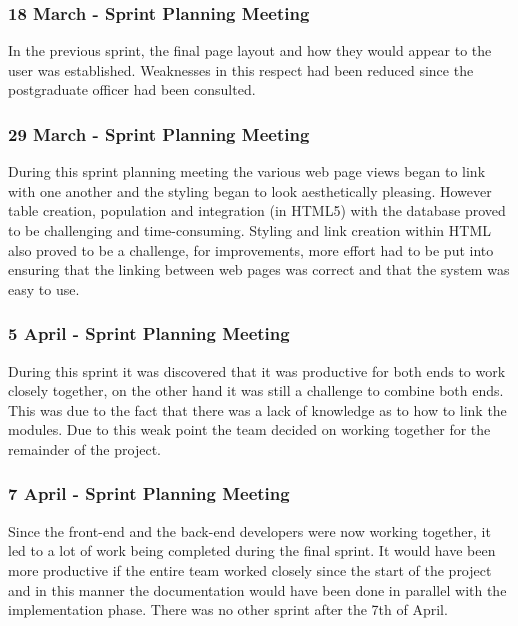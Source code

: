 \documentclass[journal]{IEEEtran}
\begin{document}
\hfill \break \subsubsection{18 March - Sprint Planning Meeting}
In the previous sprint, the final page layout and how they would appear to the user was established. Weaknesses in this respect had been reduced since the postgraduate officer had been consulted.
\hfill \break \subsubsection{29 March - Sprint Planning Meeting}
During this sprint planning meeting the various web page views began to link with one another and the styling began to look aesthetically pleasing. However table creation, population and integration (in HTML5) with the database proved to be challenging and time-consuming. Styling and link creation within HTML also proved to be a challenge, for improvements, more effort had to be put into ensuring that the linking between web pages was correct and that the system was easy to use.
\hfill \break \subsubsection{5 April - Sprint Planning Meeting}
During this sprint it was discovered that it was productive for both ends to work closely together, on the other hand it was still a challenge to combine both ends. This was due to the fact that there was a lack of knowledge as to how to link the modules. Due to this weak point the team decided on working together for the remainder of the project.
\hfill \break \subsubsection{7 April - Sprint Planning Meeting}
Since the front-end and the back-end developers were now working together, it led to a lot of work being completed during the final sprint. It would have been more productive if the entire team worked closely since the start of the project and in this manner the documentation would have been done in parallel with the implementation phase. There was no other sprint after the 7th of April.


\end{document}
